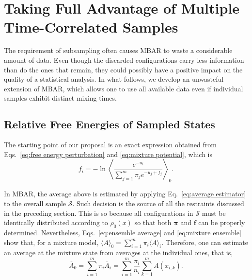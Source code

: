 \documentclass[
    journal=jctcce,
    layout=twocolumn
]{achemso}
\newcommand{\vt}[1]{\boldsymbol{\mathbf{#1}}}   %
\newcommand{\avg}[1]{\overline{#1}}             %
\begin{document}
\section{Taking Full Advantage of Multiple Time-Correlated Samples}

The requirement of subsampling often causes MBAR to waste a considerable amount of data. Even though the discarded configurations carry less information than do the ones that remain, they could possibly have a positive impact on the quality of a statistical analysis. In what follows, we develop an unwasteful extension of MBAR, which allows one to use all available data even if individual samples exhibit distinct mixing times.

\subsection{Relative Free Energies of Sampled States}

The starting point of our proposal is an exact expression obtained from Eqs.~\eqref{eq:free energy perturbation} and \eqref{eq:mixture potential}, which is
\begin{equation*}
\label{eq:free energy exact}
f_i = -\ln \left\langle \frac{e^{-u_i}}{\sum_{j=1}^m \pi_j e^{-u_j + f_j}} \right\rangle_0.
\end{equation*}

In MBAR, the average above is estimated by applying Eq.~\eqref{eq:average estimator} to the overall sample $\mathcal S$. Such decision is the source of all the restraints discussed in the preceding section. This is so because all configurations in $\mathcal S$ must be identically distributed according to $\rho_0(x)$ so that both $\vt \pi$ and $\vt f$ can be properly determined. Nevertheless, Eqs.~\eqref{eq:ensemble average} and \eqref{eq:mixture ensemble} show that, for a mixture model, $\langle A \rangle_0 = \sum_{i=1}^m \pi_i \langle A \rangle_i$. Therefore, one can estimate an average at the mixture state from averages at the individual ones, that is,
\begin{equation}
\label{eq:mixture average estimator}
{\avg A}_0 = \sum_{i=1}^m \pi_i \avg{A}_i = \sum_{i=1}^m \frac{\pi_i}{n_i} \sum_{k=1}^m A(x_{i,k}).
\end{equation}
\end{document}
